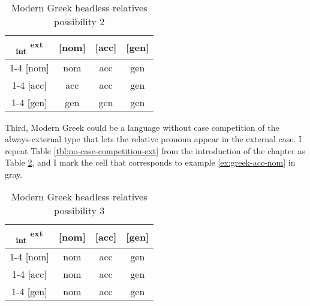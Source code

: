   \begin{table}[ht]
    \center
    \caption{Modern Greek headless relatives possibility 2}
    \begin{tabular}{c|c|c|c}
      \toprule
      \textsubscript{\ac{int}} \textsuperscript{\ac{ext}}
             & [\ac{nom}]
             & [\ac{acc}]
             & [\ac{gen}]
             \\ \cmidrule{1-4}
         [\ac{nom}]
             & \ac{nom}
             & \cellcolor{LG}\ac{acc}
             & \ac{gen}
             \\ \cmidrule{1-4}
         [\ac{acc}]
             & \ac{acc}
             & \ac{acc}
             & \ac{gen}
             \\ \cmidrule{1-4}
         [\ac{gen}]
             & \ac{gen}
             & \ac{gen}
             & \ac{gen}
             \\
       \bottomrule
    \end{tabular}
      \label{tbl:greek-poss2}
  \end{table}

Third, Modern Greek could be a language without case competition of the always-external type that lets the relative pronoun appear in the external case. I repeat Table \ref{tbl:no-case-competition-ext} from the introduction of the chapter as Table \ref{tbl:greek-poss3}, and I mark the cell that corresponds to example \ref{ex:greek-acc-nom} in gray.

 \begin{table}[ht]
   \center
   \caption{Modern Greek headless relatives possibility 3}
   \begin{tabular}{c|c|c|c}
     \toprule
    \textsubscript{\ac{int}} \textsuperscript{\ac{ext}}
           & [\ac{nom}]
           & [\ac{acc}]
           & [\ac{gen}]
           \\ \cmidrule{1-4}
       [\ac{nom}]
           & \ac{nom}
           & \cellcolor{LG}\ac{acc}
           & \ac{gen}
           \\ \cmidrule{1-4}
       [\ac{acc}]
           & \ac{nom}
           & \ac{acc}
           & \ac{gen}
           \\ \cmidrule{1-4}
       [\ac{gen}]
           & \ac{nom}
           & \ac{acc}
           & \ac{gen}
           \\
     \bottomrule
   \end{tabular}
   \label{tbl:greek-poss3}
 \end{table}

